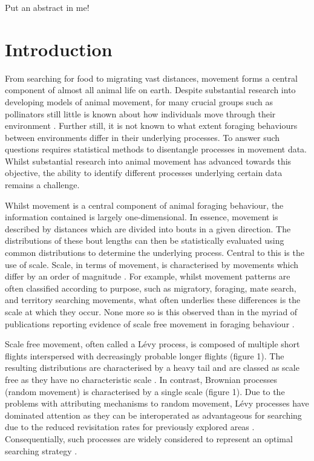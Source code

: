 \documentclass[11pt,usenames,dvipsnames,a4paper]{article}
\begin{document}
\begin{linenumbers}
Put an abstract in me!
\end{linenumbers}

\section{Introduction}

\begin{linenumbers}
\hspace{\parindent}
From searching for food to migrating vast distances, movement forms a central component of almost all animal life on earth. Despite substantial research into developing models of animal movement, for many crucial groups such as pollinators still little is known about how individuals move through their environment \citep{Nathan2008}. Further still, it is not known to what extent foraging behaviours between environments differ in their underlying processes. To answer such questions requires statistical methods to disentangle processes in movement data. Whilst substantial research into animal movement has advanced towards this objective, the ability to identify different processes underlying certain data remains a challenge. 

Whilst movement is a central component of animal foraging behaviour, the information contained is largely one-dimensional. In essence, movement is described by distances which are divided into bouts in a given direction. The distributions of these bout lengths can then be statistically evaluated using common distributions to determine the underlying process. Central to this is the use of scale. Scale, in terms of movement, is characterised by movements which differ by an order of magnitude \citep{Levin1992}. For example, whilst movement patterns are often classified according to purpose, such as migratory, foraging, mate search, and territory searching movements, what often underlies these differences is the scale at which they occur. None more so is this observed than in the myriad of publications reporting evidence of scale free movement in foraging behaviour \citep{Harris2012, Ariel2015, Humphries2010, Baronchelli2013, Boyer, Ayala-Orozco2004, Sims2008, Viswanathan1999}.

Scale free movement, often called a L\'evy process, is composed of multiple short flights interspersed with decreasingly probable longer flights (figure 1). The resulting distributions are characterised by a heavy tail and are classed as scale free as they have no characteristic scale \citep{Reynolds2018}. In contrast, Brownian processes (random movement) is characterised by a single scale (figure 1). Due to the problems with attributing mechanisms to random movement, L\'evy processes have dominated attention as they can be interoperated as advantageous for searching due to the reduced revisitation rates for previously explored areas \citep{Viswanathan1999}. Consequentially, such processes are widely considered to represent an optimal searching strategy \citep{Viswanathan1999, Humphries2014}.


\end{linenumbers}
\end{document}
